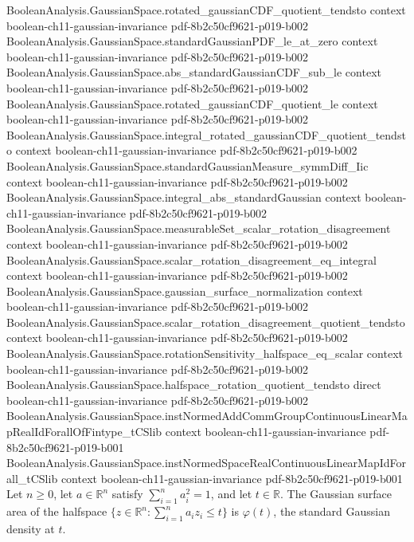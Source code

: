 \begin{theorem}
\proofstep
  {BooleanAnalysis.GaussianSpace.rotated_gaussianCDF_quotient_tendsto}
  {context}
  {boolean-ch11-gaussian-invariance}
  {pdf-8b2c50cf9621-p019-b002}
\proofstep
  {BooleanAnalysis.GaussianSpace.standardGaussianPDF_le_at_zero}
  {context}
  {boolean-ch11-gaussian-invariance}
  {pdf-8b2c50cf9621-p019-b002}
\proofstep
  {BooleanAnalysis.GaussianSpace.abs_standardGaussianCDF_sub_le}
  {context}
  {boolean-ch11-gaussian-invariance}
  {pdf-8b2c50cf9621-p019-b002}
\proofstep
  {BooleanAnalysis.GaussianSpace.rotated_gaussianCDF_quotient_le}
  {context}
  {boolean-ch11-gaussian-invariance}
  {pdf-8b2c50cf9621-p019-b002}
\proofstep
  {BooleanAnalysis.GaussianSpace.integral_rotated_gaussianCDF_quotient_tendsto}
  {context}
  {boolean-ch11-gaussian-invariance}
  {pdf-8b2c50cf9621-p019-b002}
\proofstep
  {BooleanAnalysis.GaussianSpace.standardGaussianMeasure_symmDiff_Iic}
  {context}
  {boolean-ch11-gaussian-invariance}
  {pdf-8b2c50cf9621-p019-b002}
\proofstep
  {BooleanAnalysis.GaussianSpace.integral_abs_standardGaussian}
  {context}
  {boolean-ch11-gaussian-invariance}
  {pdf-8b2c50cf9621-p019-b002}
\proofstep
  {BooleanAnalysis.GaussianSpace.measurableSet_scalar_rotation_disagreement}
  {context}
  {boolean-ch11-gaussian-invariance}
  {pdf-8b2c50cf9621-p019-b002}
\proofstep
  {BooleanAnalysis.GaussianSpace.scalar_rotation_disagreement_eq_integral}
  {context}
  {boolean-ch11-gaussian-invariance}
  {pdf-8b2c50cf9621-p019-b002}
\proofstep
  {BooleanAnalysis.GaussianSpace.gaussian_surface_normalization}
  {context}
  {boolean-ch11-gaussian-invariance}
  {pdf-8b2c50cf9621-p019-b002}
\proofstep
  {BooleanAnalysis.GaussianSpace.scalar_rotation_disagreement_quotient_tendsto}
  {context}
  {boolean-ch11-gaussian-invariance}
  {pdf-8b2c50cf9621-p019-b002}
\proofstep
  {BooleanAnalysis.GaussianSpace.rotationSensitivity_halfspace_eq_scalar}
  {context}
  {boolean-ch11-gaussian-invariance}
  {pdf-8b2c50cf9621-p019-b002}
\proofstep
  {BooleanAnalysis.GaussianSpace.halfspace_rotation_quotient_tendsto}
  {direct}
  {boolean-ch11-gaussian-invariance}
  {pdf-8b2c50cf9621-p019-b002}
\proofstep
  {BooleanAnalysis.GaussianSpace.instNormedAddCommGroupContinuousLinearMapRealIdForallOfFintype_tCSlib}
  {context}
  {boolean-ch11-gaussian-invariance}
  {pdf-8b2c50cf9621-p019-b001}
\proofstep
  {BooleanAnalysis.GaussianSpace.instNormedSpaceRealContinuousLinearMapIdForall_tCSlib}
  {context}
  {boolean-ch11-gaussian-invariance}
  {pdf-8b2c50cf9621-p019-b001}
Let $n\ge 0$, let $a\in\mathbb R^n$ satisfy $\sum_{i=1}^n a_i^2=1$, and let $t\in\mathbb
R$. The Gaussian surface area of the halfspace $\{z\in\mathbb R^n:\sum_{i=1}^n a_i
z_i\le t\}$ is $\varphi(t)$, the standard Gaussian density at $t$.
\end{theorem}

